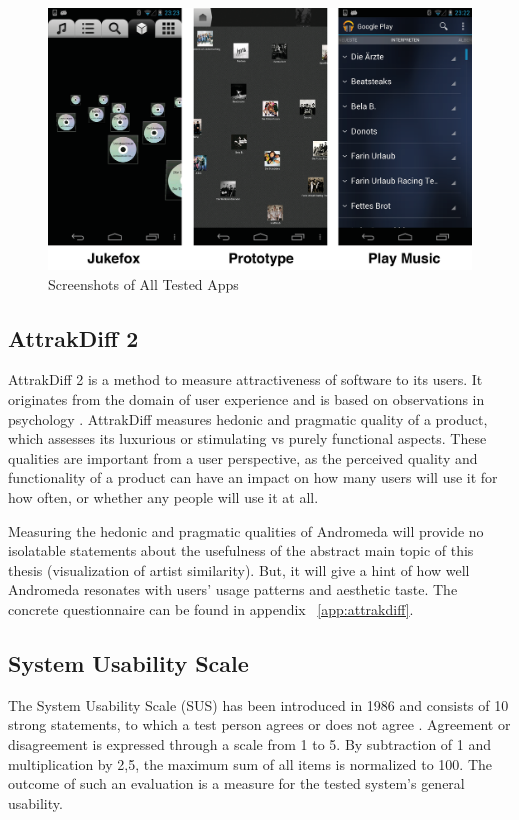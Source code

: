 \begin{figure}[H]
  \centering
    \includegraphics[width=1\textwidth]{figures/apps_screenshots}
  \caption{Screenshots of All Tested Apps}
  \label{fig:apps_screenshots}
\end{figure}

\subsection{AttrakDiff 2}

AttrakDiff 2 \cite{tubiblio21687} is a method to measure attractiveness of software to its users. It originates from the domain of user experience and is based on observations in psychology \cite{DBLP:journals/ijhci/Hassenzahl01}. AttrakDiff measures hedonic and pragmatic quality of a product, which assesses its luxurious or stimulating vs purely functional aspects. These qualities are important from a user perspective, as the perceived quality and functionality of a product can have an impact on how many users will use it for how often, or whether any people will use it at all.

Measuring the hedonic and pragmatic qualities of Andromeda will provide no isolatable statements about the usefulness of the abstract main topic of this thesis (visualization of artist similarity). But, it will give a hint of how well Andromeda resonates with users' usage patterns and aesthetic taste. The concrete questionnaire can be found in appendix ~\ref{app:attrakdiff}.

\subsection{System Usability Scale}

The System Usability Scale (SUS) has been introduced in 1986 and consists of 10 strong statements, to which a test person agrees or does not agree \cite{Lewis:2009}. Agreement or disagreement is expressed through a scale from 1 to 5. By subtraction of 1 and multiplication by 2,5, the maximum sum of all items is normalized to 100. The outcome of such an evaluation is a measure for the tested system's general usability.

